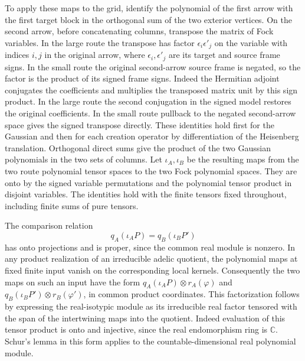 To apply these maps to the grid, identify the polynomial
of the first arrow with the first target block in the
orthogonal sum of the two exterior vertices. On the second
arrow, before concatenating columns, transpose the matrix
of Fock variables. In the large route the transpose has
factor \(\epsilon_i\epsilon'_j\) on the variable with
indices \(i,j\) in the original arrow, where
\(\epsilon_i,\epsilon'_j\) are its target and source
frame signs. In the small route the original second-arrow
source frame is negated, so the factor is the product of
its signed frame signs. Indeed the Hermitian adjoint
conjugates the coefficients and multiplies the transposed
matrix unit by this sign product. In the large route the
second conjugation in the signed model restores the original
coefficients. In the small route pullback to the negated
second-arrow space gives the signed transpose directly.
These identities hold first for the Gaussian and then for
each creation operator by differentiation of the Heisenberg
translation. Orthogonal direct sums give the product of
the two Gaussian polynomials in the two sets of columns.
Let \(\iota_A,\iota_B\) be the resulting maps from the
two route polynomial tensor spaces to the two Fock
polynomial spaces. They are onto by the signed variable
permutations and the polynomial tensor product in disjoint
variables. The identities hold with the finite tensors
fixed throughout, including finite sums of pure tensors.

The comparison relation
\[
 q_A(\iota_A P)=q_B(\iota_B P')
\]
has onto projections and is proper, since the common
real module is nonzero. In any product realization of an
irreducible adelic quotient, the polynomial maps at fixed
finite input vanish on the corresponding local kernels.
Consequently the two maps on such an input have the form
\(q_A(\iota_A P)\otimes r_A(\varphi)\) and
\(q_B(\iota_B P')\otimes r_B(\varphi')\), in common
product coordinates. This factorization follows by
expressing the real-isotypic module as its irreducible real
factor tensored with the span of the intertwining maps into
the quotient. Indeed evaluation of this tensor product is
onto and injective, since the real endomorphism ring is
\(\mathbb C\). Schur's lemma in this form applies to
the countable-dimensional real polynomial module.

